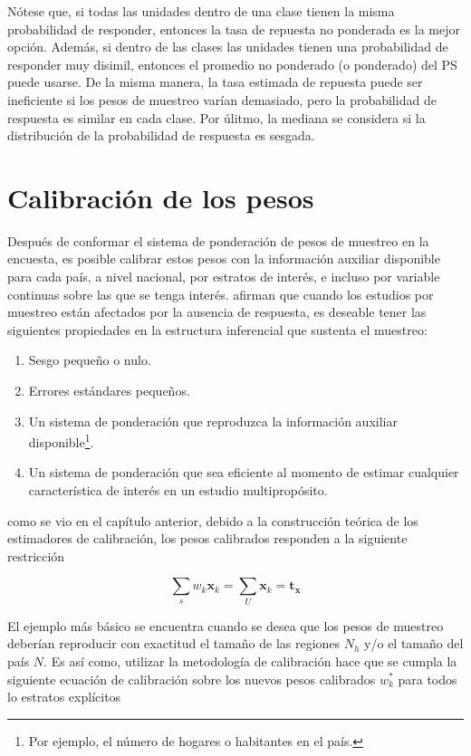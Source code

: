 \documentclass[
  10pt,
  spanish,
]{book}
\providecommand{\tightlist}{%
  \setlength{\itemsep}{0pt}\setlength{\parskip}{0pt}}
\begin{document}
Nótese que, si todas las unidades dentro de una clase tienen la misma probabilidad de responder, entonces la tasa de repuesta no ponderada es la mejor opción. Además, si dentro de las clases las unidades tienen una probabilidad de responder muy disimil, entonces el promedio no ponderado (o ponderado) del PS puede usarse. De la misma manera, la tasa estimada de repuesta puede ser ineficiente si los pesos de muestreo varían demasiado, pero la probabilidad de respuesta es similar en cada clase. Por úlitmo, la mediana se considera si la distribución de la probabilidad de respuesta es sesgada.

\hypertarget{calibraciuxf3n-de-los-pesos}{%
\section{Calibración de los pesos}\label{calibraciuxf3n-de-los-pesos}}

Después de conformar el sistema de ponderación de pesos de muestreo en la encuesta, es posible calibrar estos pesos con la información auxiliar disponible para cada país, a nivel nacional, por estratos de interés, e incluso por variable continuas sobre las que se tenga interés. \citet{Sarndal_Lundstrom_2006} afirman que cuando los estudios por muestreo están afectados por la ausencia de respuesta, es deseable tener las siguientes propiedades en la estructura inferencial que sustenta el muestreo:

\begin{enumerate}
\def\labelenumi{\arabic{enumi}.}
\tightlist
\item
  Sesgo pequeño o nulo.
\item
  Errores estándares pequeños.
\item
  Un sistema de ponderación que reproduzca la información auxiliar disponible\footnote{Por ejemplo, el número de hogares o habitantes en el país.}.
\item
  Un sistema de ponderación que sea eficiente al momento de estimar cualquier característica de interés en un estudio multipropósito.
\end{enumerate}

como se vio en el capítulo anterior, debido a la construcción teórica de los estimadores de calibración, los pesos calibrados responden a la siguiente restricción

\[
\sum_{s}w_{k}\boldsymbol{x}_k = \sum_{U}\boldsymbol{x}_{k} = \boldsymbol{t}_{\boldsymbol{x}}
\]

El ejemplo más básico se encuentra cuando se desea que los pesos de muestreo deberían reproducir con exactitud el tamaño de las regiones \(N_h\) y/o el tamaño del país \(N\). Es así como, utilizar la metodología de calibración \citep{Deville_Sarndal_1992} hace que se cumpla la siguiente ecuación de calibración sobre los nuevos pesos calibrados \(w_k^*\) para todos lo estratos explícitos
\end{document}
